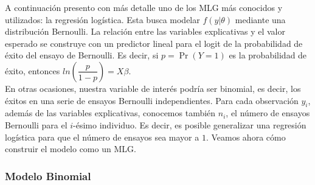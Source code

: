 A continuación presento con más detalle uno de los MLG más conocidos y utilizados: la regresión logística. Esta busca modelar $f(y|\theta)$ mediante una distribución Bernoulli. La relación entre las variables explicativas y el valor esperado se construye con un predictor lineal para el logit de la probabilidad de éxito del ensayo de Bernoulli. Es decir, si $p = \Pr(Y=1)$ es la probabilidad de éxito, entonces $ln\left(\dfrac{p}{1-p}\right)=X\beta$.\\ 

En otras ocasiones, nuestra variable de interés podría ser binomial, es decir, los éxitos en una serie de ensayos Bernoulli independientes. Para cada observación $y_i$, además de las variables explicativas, conocemos también $n_i$, el número de ensayos Bernoulli para el $i$-ésimo individuo. Es decir, es posible generalizar una regresión logística para que el número de ensayos sea mayor a $1$. Veamos ahora cómo construir el modelo como un MLG.

\subsubsection*{Modelo Binomial}


